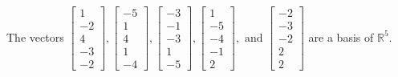 \begin{exercise}
\begin{exerciseStatement}
  \end{exerciseStatement}
  \begin{exerciseAnswer}
   The vectors \(\left[\begin{array}{r}
1 \\
-2 \\
4 \\
-3 \\
-2
\end{array}\right] , \left[\begin{array}{r}
-5 \\
1 \\
4 \\
1 \\
-4
\end{array}\right] , \left[\begin{array}{r}
-3 \\
-1 \\
-3 \\
1 \\
-5
\end{array}\right] , \left[\begin{array}{r}
1 \\
-5 \\
-4 \\
-1 \\
2
\end{array}\right] , \text{ and } \left[\begin{array}{r}
-2 \\
-3 \\
-2 \\
2 \\
2
\end{array}\right]\) 
  	 are  a basis of \(\mathbb{R}^5\).
  


  \end{exerciseAnswer}
\end{exercise}
